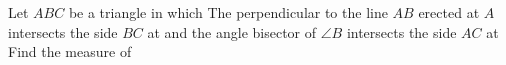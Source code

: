Let $ABC$ be a triangle in which  The perpendicular to the line $AB$ erected at $A$ intersects the side $BC$ at  and the angle bisector of $\angle B$ intersects the side $AC$ at 
Find the measure of 